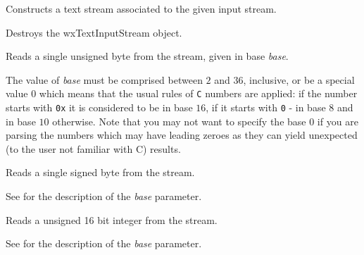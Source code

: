 Constructs a text stream associated to the given input stream.





\label{wxtextinputstreamdtor}


Destroys the wxTextInputStream object.

\label{wxtextinputstreamread8}


Reads a single unsigned byte from the stream, given in base {\it base}.

The value of {\it base} must be comprised between $2$ and $36$, inclusive, or
be a special value $0$ which means that the usual rules of {\tt C} numbers are
applied: if the number starts with {\tt 0x} it is considered to be in base
$16$, if it starts with {\tt 0} - in base $8$ and in base $10$ otherwise. Note
that you may not want to specify the base $0$ if you are parsing the numbers
which may have leading zeroes as they can yield unexpected (to the user not
familiar with C) results.

\label{wxtextinputstreamread8s}


Reads a single signed byte from the stream.

See  for the
description of the {\it base} parameter.

\label{wxtextinputstreamread16}


Reads a unsigned 16 bit integer from the stream.

See  for the
description of the {\it base} parameter.

\label{wxtextinputstreamread16s}

